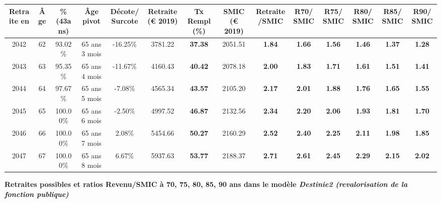 \begin{adjustbox}{max width=\textwidth} 
\begin{tabular}[htb]{|c|c||c|c|c||c|c||c|c||c|c|c|c|c|} 
\hline 
 Retraite en &  Âge &  \%(43ans) &  Âge pivot &  Décote/Surcote &  Retraite (\euro{} 2019) &  Tx Rempl(\%) &  SMIC (\euro{} 2019) &  Retraite/SMIC &  R70/SMIC &  R75/SMIC &  R80/SMIC &  R85/SMIC &  R90/SMIC \\ 
\hline \hline 
 2042 &  62 &  93.02\% &  65 ans 3 mois &  -16.25\% &  3781.22 &  {\bf 37.38} &  2051.51 &  {\bf 1.84} &  {\bf 1.66} &  {\bf 1.56} &  {\bf 1.46} &  {\bf 1.37} &  {\bf 1.28} \\ 
\hline 
 2043 &  63 &  95.35\% &  65 ans 4 mois &  -11.67\% &  4160.43 &  {\bf 40.42} &  2078.18 &  {\bf 2.00} &  {\bf 1.83} &  {\bf 1.71} &  {\bf 1.61} &  {\bf 1.51} &  {\bf 1.41} \\ 
\hline 
 2044 &  64 &  97.67\% &  65 ans 5 mois &  -7.08\% &  4565.34 &  {\bf 43.57} &  2105.20 &  {\bf 2.17} &  {\bf 2.01} &  {\bf 1.88} &  {\bf 1.76} &  {\bf 1.65} &  {\bf 1.55} \\ 
\hline 
 2045 &  65 &  100.00\% &  65 ans 6 mois &  -2.50\% &  4997.52 &  {\bf 46.87} &  2132.56 &  {\bf 2.34} &  {\bf 2.20} &  {\bf 2.06} &  {\bf 1.93} &  {\bf 1.81} &  {\bf 1.70} \\ 
\hline 
 2046 &  66 &  100.00\% &  65 ans 7 mois &  2.08\% &  5454.66 &  {\bf 50.27} &  2160.29 &  {\bf 2.52} &  {\bf 2.40} &  {\bf 2.25} &  {\bf 2.11} &  {\bf 1.98} &  {\bf 1.85} \\ 
\hline 
 2047 &  67 &  100.00\% &  65 ans 8 mois &  6.67\% &  5937.63 &  {\bf 53.77} &  2188.37 &  {\bf 2.71} &  {\bf 2.61} &  {\bf 2.45} &  {\bf 2.29} &  {\bf 2.15} &  {\bf 2.02} \\ 
\hline 
\hline 
\end{tabular} 
\end{adjustbox} 
 
 \vspace{0.1cm} 
{\bf \noindent Retraites possibles et ratios Revenu/SMIC à 70, 75, 80, 85, 90 ans dans le modèle \emph{Destinie2 (revalorisation de la fonction publique)}}  
 
